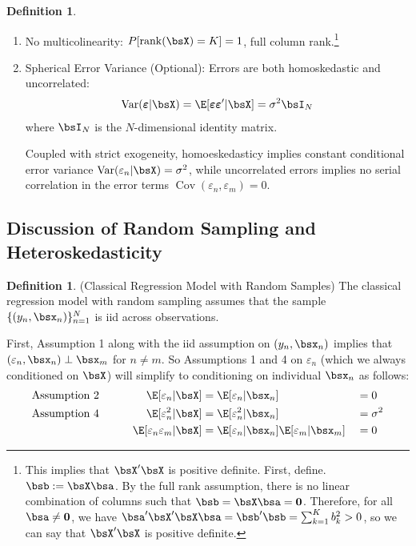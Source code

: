 \documentclass[12pt]{article}
\theoremstyle{plain}
\theoremstyle{definition}
\newtheorem{defn}[thm]{Definition}
\theoremstyle{remark}
\newcommand{\bsvarepsilon}{\boldsymbol{\varepsilon}}
\renewcommand{\bso}{\boldsymbol{0}}
\newcommand{\Cov}{\operatorname{Cov}}
\newcommand{\rank}{\operatorname{rank}}
\newcommand{\Var}{\operatorname{Var}}
\newcommand{\nN}{_{n=1}^N}
\begin{document}
\begin{defn}
\begin{enumerate}
  \item No multicolinearity: $P[\rank(\bsX)=K]=1$, full column
    rank.\footnote{%
      This implies that $\bsX'\bsX$ is positive definite. First, define.
      $\bsb:=\bsX \bsa$. By the full rank assumption, there is no linear
      combination of columns such that $\bsb=\bsX\bsa = \bso$.
      Therefore, for all $\bsa\neq \bso$, we have
      $\bsa'\bsX'\bsX\bsa=\bsb'\bsb = \sum_{k=1}^K b_k^2 > 0$, so we can
      say that $\bsX'\bsX$ is positive definite.
    }

  \item Spherical Error Variance (Optional): Errors are both
    homoskedastic and uncorrelated:
    \begin{align*}
      \Var(\bsvarepsilon|\bsX) =
      \E[\bsvarepsilon\bsvarepsilon'|\bsX] = \sigma^2\bsI_N
    \end{align*}
    where $\bsI_N$ is the $N$-dimensional identity matrix.

    Coupled with strict exogeneity, homoeskedasticy implies constant
    conditional error variance $\Var(\varepsilon_n|\bsX)=\sigma^2$,
    while uncorrelated errors implies no serial correlation
    in the error terms $\Cov(\varepsilon_n,\varepsilon_m)=0$.
\end{enumerate}
\end{defn}

\clearpage
\subsection{Discussion of Random Sampling and Heteroskedasticity}
\label{sec:discusshetero}

\begin{defn}(Classical Regression Model with Random Samples)
The classical regression model with random sampling assumes that the
sample $\{(y_n,\bsx_n)\}\nN$ is iid across observations.

First, Assumption 1 along with the iid assumption on
$(y_n,\bsx_n)$ implies that $(\varepsilon_n, \bsx_n)\perp \bsx_m$ for
$n\neq m$.
So Assumptions 1 and 4 on $\varepsilon_n$ (which we always
conditioned on $\bsX$) will simplify to conditioning on individual
$\bsx_n$ as follows:
\begin{alignat*}{5}
  \text{Assumption 2} &&\qquad
   \E[\varepsilon_n | \bsX] &=
   \E[\varepsilon_n | \bsx_n] &&= 0\\
  \text{Assumption 4} &&\qquad
   \E[\varepsilon_n^2 | \bsX] &=
   \E[\varepsilon_n^2 | \bsx_n] &&= \sigma^2\\
  \text{} &&\qquad
   \E[\varepsilon_n\varepsilon_m|\bsX] &=
   \E[\varepsilon_n|\bsx_n] \E[\varepsilon_m|\bsx_m]
   &&=0
\end{alignat*}
\end{defn}
\end{document}
